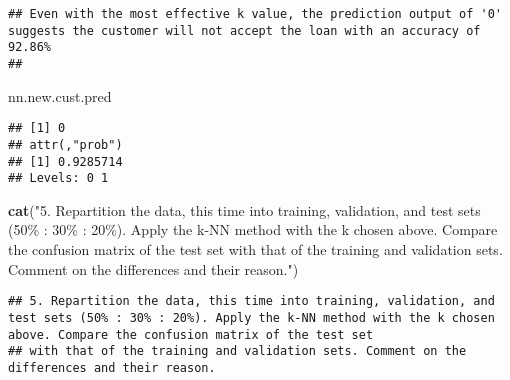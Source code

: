 \documentclass[
]{article}
\newenvironment{Shaded}{\begin{snugshade}}{\end{snugshade}}
\newcommand{\FunctionTok}[1]{\textcolor[rgb]{0.13,0.29,0.53}{\textbf{#1}}}
\newcommand{\NormalTok}[1]{#1}
\newcommand{\StringTok}[1]{\textcolor[rgb]{0.31,0.60,0.02}{#1}}
\begin{document}
\begin{verbatim}
## Even with the most effective k value, the prediction output of '0' suggests the customer will not accept the loan with an accuracy of 92.86% 
## 
\end{verbatim}

\begin{Shaded}
\begin{Highlighting}[]
\NormalTok{nn.new.cust.pred}
\end{Highlighting}
\end{Shaded}

\begin{verbatim}
## [1] 0
## attr(,"prob")
## [1] 0.9285714
## Levels: 0 1
\end{verbatim}

\begin{Shaded}
\begin{Highlighting}[]
\FunctionTok{cat}\NormalTok{(}\StringTok{"5. Repartition the data, this time into training, validation, and test sets (50\% : 30\% : 20\%). Apply the k{-}NN method with the k chosen above. Compare the confusion matrix of the test set}
\StringTok{with that of the training and validation sets. Comment on the differences and their reason."}\NormalTok{)}
\end{Highlighting}
\end{Shaded}

\begin{verbatim}
## 5. Repartition the data, this time into training, validation, and test sets (50% : 30% : 20%). Apply the k-NN method with the k chosen above. Compare the confusion matrix of the test set
## with that of the training and validation sets. Comment on the differences and their reason.
\end{verbatim}
\end{document}

